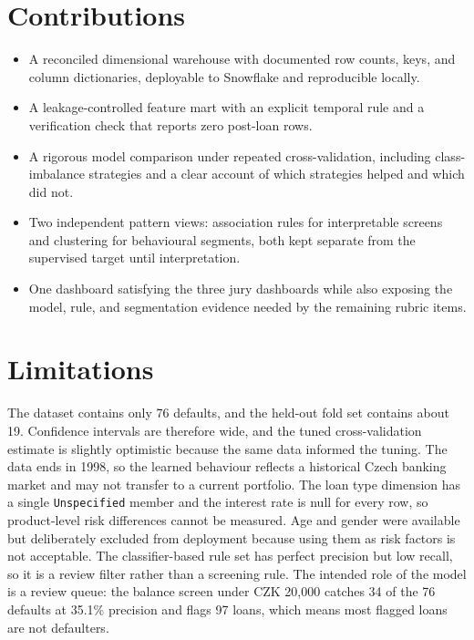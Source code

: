 \section{Contributions}
\begin{itemize}
    \item A reconciled dimensional warehouse with documented row counts, keys, and column dictionaries, deployable to Snowflake and reproducible locally.
    \item A leakage-controlled feature mart with an explicit temporal rule and a verification check that reports zero post-loan rows.
    \item A rigorous model comparison under repeated cross-validation, including class-imbalance strategies and a clear account of which strategies helped and which did not.
    \item Two independent pattern views: association rules for interpretable screens and clustering for behavioural segments, both kept separate from the supervised target until interpretation.
    \item One dashboard satisfying the three jury dashboards while also exposing the model, rule, and segmentation evidence needed by the remaining rubric items.
\end{itemize}

\section{Limitations}
The dataset contains only 76 defaults, and the held-out fold set contains about 19. Confidence intervals are therefore wide, and the tuned cross-validation estimate is slightly optimistic because the same data informed the tuning. The data ends in 1998, so the learned behaviour reflects a historical Czech banking market and may not transfer to a current portfolio. The loan type dimension has a single \texttt{Unspecified} member and the interest rate is null for every row, so product-level risk differences cannot be measured. Age and gender were available but deliberately excluded from deployment because using them as risk factors is not acceptable. The classifier-based rule set has perfect precision but low recall, so it is a review filter rather than a screening rule. The intended role of the model is a review queue: the balance screen under CZK 20{,}000 catches 34 of the 76 defaults at 35.1\% precision and flags 97 loans, which means most flagged loans are not defaulters.

